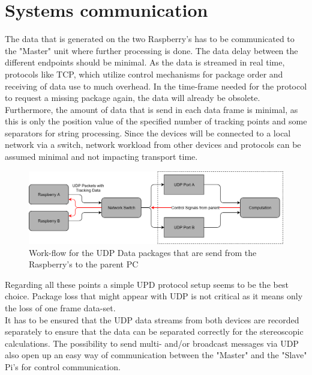 \section{Systems communication}
The data that is generated on the two Raspberry's has to be communicated to the "Master" unit where further processing is done. The data delay between the different endpoints should be minimal. As the data is streamed in real time, protocols like TCP, which utilize control mechanisms for package order and receiving of data use to much overhead. In the time-frame needed for the protocol to request a missing package again, the data will already be obsolete. \\Furthermore, the amount of data that is send in each data frame is minimal, as this is only the position value of the specified number of tracking points and some separators for string processing. Since the devices will be connected to a local network via a switch, network workload from other devices and protocols can be assumed minimal and not impacting transport time.\\\begin{figure}[H]
\includegraphics[width=\textwidth]{images/Network_Diagram.png}
\caption{Work-flow for the UDP Data packages that are send from the Raspberry's to the parent PC}
\label{img:netzwerk_diagram} 
\end{figure}
Regarding all these points a simple UPD protocol setup seems to be the best choice. Package loss that might appear with UDP is not critical as it means only the loss of one frame data-set.\\
It has to be ensured that the UDP data streams from both devices are recorded separately to ensure that the data can be separated correctly for the stereoscopic calculations.
The possibility to send multi- and/or broadcast messages via UDP also open up an easy way of communication between the "Master" and the "Slave" Pi's for control communication.

